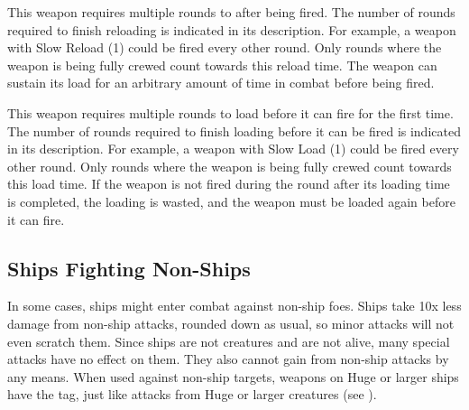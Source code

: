              This weapon requires multiple rounds to after being fired.
            The number of rounds required to finish reloading is indicated in its description.
            For example, a weapon with Slow Reload (1) could be fired every other round.
            Only rounds where the weapon is being fully crewed count towards this reload time.
            The weapon can sustain its load for an arbitrary amount of time in combat before being fired.

             This weapon requires multiple rounds to load before it can fire for the first time.
            The number of rounds required to finish loading before it can be fired is indicated in its description.
            For example, a weapon with Slow Load (1) could be fired every other round.
            Only rounds where the weapon is being fully crewed count towards this load time.
            If the weapon is not fired during the round after its loading time is completed, the loading is wasted, and the weapon must be loaded again before it can fire.

    \subsection{Ships Fighting Non-Ships}
        In some cases, ships might enter combat against non-ship foes.
        Ships take 10x less damage from non-ship attacks, rounded down as usual, so minor attacks will not even scratch them.
        Since ships are not creatures and are not alive, many special attacks have no effect on them.
        They also cannot gain  from non-ship attacks by any means.
        When used against non-ship targets, weapons on Huge or larger ships have the  tag, just like attacks from Huge or larger creatures (see ).

